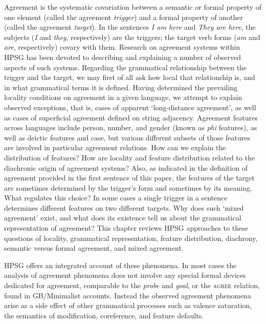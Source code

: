 \documentclass[output=paper]{langsci/langscibook}
\begin{document}
Agreement is the systematic covariation between a semantic or formal property of one element (called the agreement \textit{trigger}) and a formal property of another (called the agreement \textit{target}).  In the sentences \textit{I am here} and \textit{They are here}, the subjects (\textit{I} and \textit{they}, respectively) are the triggers; the target verb forms (\textit{am} and \textit{are}, respectively) covary with them.  Research on  agreement systems within HPSG has been devoted to describing and explaining a number of observed aspects of such systems.  Regarding the grammatical relationship between the trigger and the target, we may first of all ask how local that relationship is, and in what grammatical terms it is defined.  Having determined the prevailing locality conditions on agreement in a given language, we attempt to explain observed exceptions, that is, cases of apparent `long-distance agreement', as well as cases of superficial agreement defined on string adjacency.  Agreement features across languages include person, number, and gender (known as \textit{phi} features), as well as deictic features and case, but various different subsets of those features are involved in particular agreement relations.  How can we explain the distribution of features?  How are locality and feature distribution related to the diachronic origin of agreement systems?  Also, as indicated in the definition of agreement provided in the first sentence of this paper, the features of the target are sometimes determined by the trigger's form and sometimes by its meaning.  What regulates this choice?   In some cases a single trigger in a sentence determines different features on two different targets.  Why does such `mixed agreement' exist, and what does its existence tell us about the grammatical representation of agreement?  
This chapter reviews HPSG approaches to these questions of locality, grammatical representation, feature distribution, diachrony, semantic versus formal agreement, and mixed agreement.  

HPSG offers an integrated account of these phenomena.  In most cases the analysis of agreement phenomena does not involve any  special formal devices dedicated for agreement, comparable to the \textit{probe} and \textit{goal}, or the \textsc{agree} relation, found in GB/Minimalist accounts.  Instead the observed agreement phenomena arise as a side effect of other grammatical processes such as valence saturation, the semantics of modification, coreference, and feature defaults.  
\end{document}
